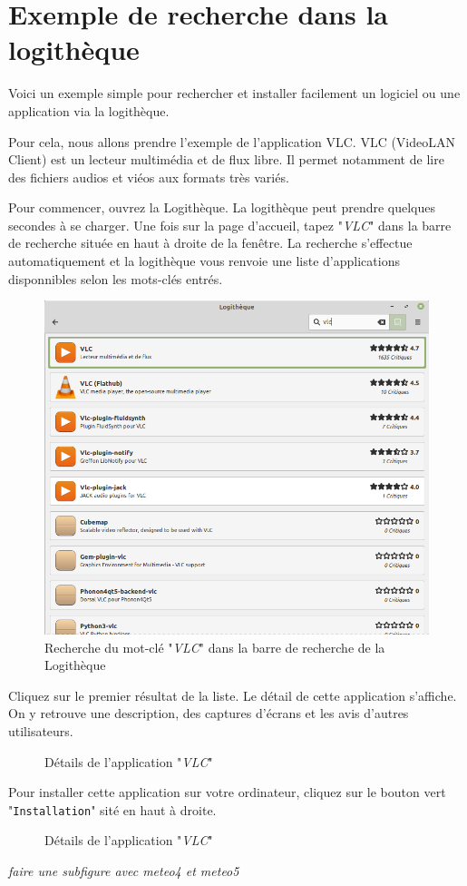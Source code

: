 \documentclass[12pt]{book}
\begin{document}
\section{Exemple de recherche dans la logithèque}\label{sec:exlogitheque}
	Voici un exemple simple pour rechercher et installer facilement un logiciel ou une application via la logithèque.\par
	Pour cela, nous allons prendre l'exemple de l'application VLC.
	VLC (VideoLAN Client) est un lecteur multimédia et de flux libre.
	Il permet notamment de lire des fichiers audios et viéos aux formats très variés.\par
	Pour commencer, ouvrez la Logithèque.
	La logithèque peut prendre quelques secondes à se charger.
	Une fois sur la page d'accueil, tapez "\textit{VLC}" dans la barre de recherche située en haut à droite de la fenêtre.
	La recherche s'effectue automatiquement et la logithèque vous renvoie une liste d'applications disponnibles selon les mots-clés entrés.
	\begin{figure}[h]
		\centering
		\includegraphics[width=.8\textwidth]{include/vlc1.png}
		\caption{Recherche du mot-clé "\textit{VLC}" dans la barre de recherche de la Logithèque}
		\label{fig:vlc1}
	\end{figure}\par
	Cliquez sur le premier résultat de la liste.
	Le détail de cette application s'affiche.
	On y retrouve une description, des captures d'écrans et les avis d'autres utilisateurs.
	\begin{figure}[h]
		\centering
		\caption{Détails de l'application "\textit{VLC}"}
		\label{fig:vlc2}
	\end{figure}\par
	Pour installer cette application sur votre ordinateur, cliquez sur le bouton vert "\texttt{Installation}" sité en haut à droite.
	\begin{figure}[h]
		\centering
		\caption{Détails de l'application "\textit{VLC}"}
		\label{fig:vlc2}
	\end{figure}
	\textit{faire une subfigure avec meteo4 et meteo5}
\end{document}
